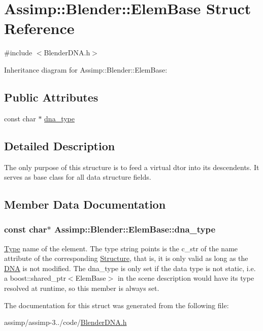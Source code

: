 \hypertarget{struct_assimp_1_1_blender_1_1_elem_base}{\section{Assimp\+:\+:Blender\+:\+:Elem\+Base Struct Reference}
\label{struct_assimp_1_1_blender_1_1_elem_base}
}


{\ttfamily \#include $<$Blender\+D\+N\+A.\+h$>$}



Inheritance diagram for Assimp\+:\+:Blender\+:\+:Elem\+Base\+:
\subsection*{Public Attributes}
\begin{DoxyCompactItemize}
\item 
const char $\ast$ \hyperlink{struct_assimp_1_1_blender_1_1_elem_base_aa24c49912a8bf11af44ae4121d71479b}{dna\+\_\+type}
\end{DoxyCompactItemize}


\subsection{Detailed Description}
The only purpose of this structure is to feed a virtual dtor into its descendents. It serves as base class for all data structure fields. 

\subsection{Member Data Documentation}
\hypertarget{struct_assimp_1_1_blender_1_1_elem_base_aa24c49912a8bf11af44ae4121d71479b}{
\subsubsection[{dna\+\_\+type}]{\setlength{\rightskip}{0pt plus 5cm}const char$\ast$ Assimp\+::\+Blender\+::\+Elem\+Base\+::dna\+\_\+type}}\label{struct_assimp_1_1_blender_1_1_elem_base_aa24c49912a8bf11af44ae4121d71479b}
\hyperlink{struct_type}{Type} name of the element. The type string points is the {\ttfamily c\+\_\+str} of the {\ttfamily name} attribute of the corresponding {\ttfamily \hyperlink{class_assimp_1_1_blender_1_1_structure}{Structure}}, that is, it is only valid as long as the \hyperlink{class_assimp_1_1_blender_1_1_d_n_a}{D\+N\+A} is not modified. The dna\+\_\+type is only set if the data type is not static, i.\+e. a boost\+::shared\+\_\+ptr$<$\+Elem\+Base$>$ in the scene description would have its type resolved at runtime, so this member is always set. 

The documentation for this struct was generated from the following file\+:\begin{DoxyCompactItemize}
\item 
assimp/assimp-\/3../code/\hyperlink{_blender_d_n_a_8h}{Blender\+D\+N\+A.\+h}\end{DoxyCompactItemize}
